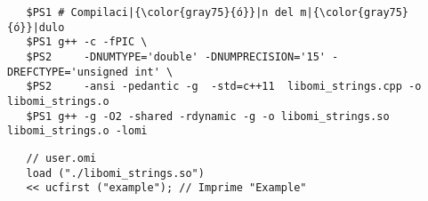 \lstset{language=bash} 
\begin{lstlisting}
   $PS1 # Compilaci|{\color{gray75}{ó}}|n del m|{\color{gray75}{ó}}|dulo
   $PS1 g++ -c -fPIC \
   $PS2     -DNUMTYPE='double' -DNUMPRECISION='15' -DREFCTYPE='unsigned int' \
   $PS2     -ansi -pedantic -g  -std=c++11  libomi_strings.cpp -o libomi_strings.o
   $PS1 g++ -g -O2 -shared -rdynamic -g -o libomi_strings.so libomi_strings.o -lomi
\end{lstlisting}

\lstset{language=omi} 
\begin{lstlisting}
   // user.omi
   load ("./libomi_strings.so")
   << ucfirst ("example"); // Imprime "Example"
\end{lstlisting}





